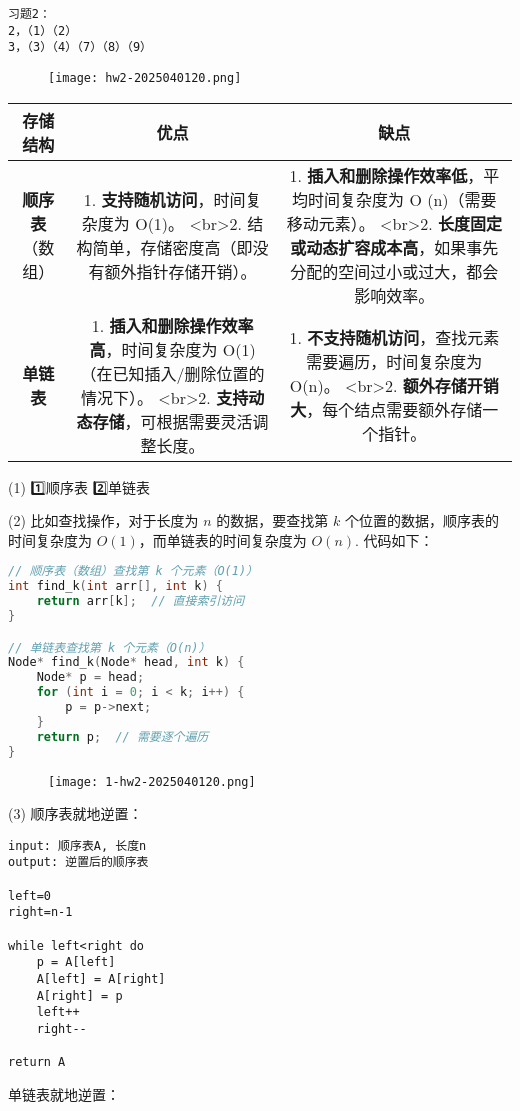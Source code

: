 \begin{lstlisting}
习题2：
2，（1）（2）
3，（3）（4）（7）（8）（9）
\end{lstlisting}
\begin{figure}[H]
\centering
\texttt{[image: hw2-2025040120.png]}
\label{}
\end{figure}

\begin{table}[h]
	\centering
	\begin{tabular}{|c|c|c|}
		\hline
		\textbf{存储结构} & \textbf{优点} & \textbf{缺点} \\
		\hline
		\textbf{顺序表}（数组） & 1. \textbf{支持随机访问}，时间复杂度为 O(1)。  <br>2. 结构简单，存储密度高（即没有额外指针存储开销）。 & 1. \textbf{插入和删除操作效率低}，平均时间复杂度为 O (n)（需要移动元素）。  <br>2. \textbf{长度固定或动态扩容成本高}，如果事先分配的空间过小或过大，都会影响效率。 \\
		\hline
		\textbf{单链表} & 1. \textbf{插入和删除操作效率高}，时间复杂度为 O(1)（在已知插入/删除位置的情况下）。  <br>2. \textbf{支持动态存储}，可根据需要灵活调整长度。 & 1. \textbf{不支持随机访问}，查找元素需要遍历，时间复杂度为 O(n)。  <br>2. \textbf{额外存储开销大}，每个结点需要额外存储一个指针。 \\
		\hline
	\end{tabular}
\end{table}
(1)
1️⃣顺序表
2️⃣单链表

(2)
比如查找操作，对于长度为 $n$ 的数据，要查找第 $k$ 个位置的数据，顺序表的时间复杂度为 $O(1)$，而单链表的时间复杂度为 $O(n)$. 代码如下：

\begin{lstlisting}[language=C++]
// 顺序表（数组）查找第 k 个元素（O(1)）
int find_k(int arr[], int k) {
    return arr[k];  // 直接索引访问
}

// 单链表查找第 k 个元素（O(n)）
Node* find_k(Node* head, int k) {
    Node* p = head;
    for (int i = 0; i < k; i++) {
        p = p->next;
    }
    return p;  // 需要逐个遍历
}
\end{lstlisting}
\begin{figure}[H]
\centering
\texttt{[image: 1-hw2-2025040120.png]}
\label{}
\end{figure}

(3)
顺序表就地逆置：

\begin{lstlisting}
input: 顺序表A, 长度n
output: 逆置后的顺序表

left=0
right=n-1

while left<right do
    p = A[left]
    A[left] = A[right]
    A[right] = p
    left++
    right--

return A
\end{lstlisting}
单链表就地逆置：


